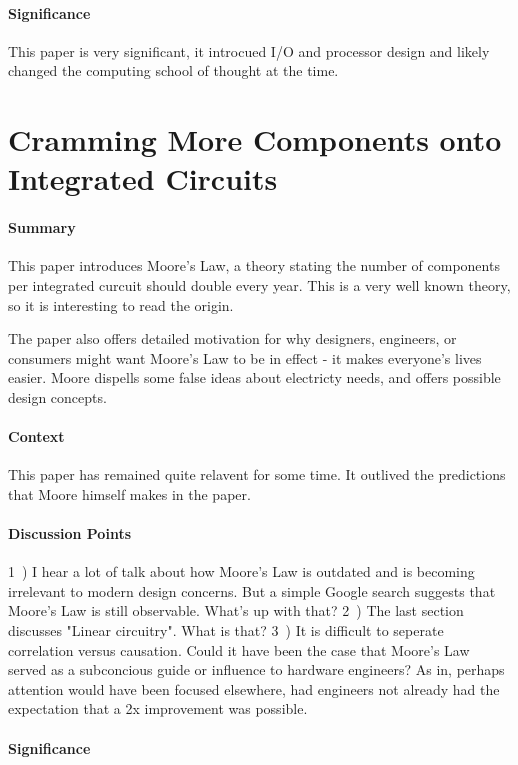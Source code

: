 \paragraph{\textbf{Significance}}
This paper is very significant, it introcued I/O and processor design and
likely changed the computing school of thought at the time.


\section {Cramming More Components onto Integrated Circuits
\cite{moore1965cramming}}


\paragraph{\textbf{Summary}}
This paper introduces Moore's Law, a theory stating the number of components
per integrated curcuit should double every year. This is a very well known
theory, so it is interesting to read the origin.

The paper also offers detailed motivation for why designers, engineers, or
consumers might want Moore's Law to be in effect - it makes everyone's lives
easier. Moore dispells some false ideas about electricty needs, and offers
possible design concepts.
\paragraph{\textbf{Context}}
This paper has remained quite relavent for some time. It outlived the
predictions that Moore himself makes in the paper.
\paragraph{\textbf{Discussion Points}}
1~) I hear a lot of talk about how Moore's Law is outdated and is becoming
irrelevant to modern design concerns. But a simple Google search suggests
that Moore's Law is still observable. What's up with that?
2~) The last section discusses "Linear circuitry". What is that?
3~) It is difficult to seperate correlation versus causation. Could it have
been the case that Moore's Law served as a subconcious guide or influence to
hardware engineers? As in, perhaps attention would have been focused
elsewhere, had engineers not already had the expectation that a 2x
improvement was possible.
\paragraph{\textbf{Significance}}


